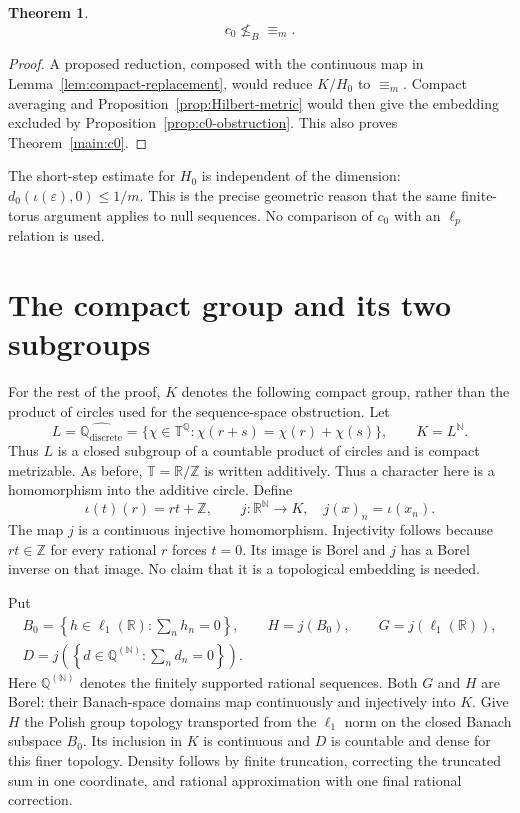 \documentclass[11pt]{article}
\newtheorem{theorem}{Theorem}[section]
\theoremstyle{definition}
\newcommand{\N}{\mathbb N}
\newcommand{\R}{\mathbb R}
\newcommand{\Z}{\mathbb Z}
\newcommand{\T}{\mathbb T}
\newcommand{\ME}{\mathrel{\equiv_m}}
\newcommand{\nleB}{\mathrel{\nleq_B}}
\newcommand{\Q}{\mathbb Q}
\begin{document}
\begin{theorem}\label{thm:c0}
\[
 c_0\nleB\ME.
\]
\end{theorem}
\begin{proof}
A proposed reduction, composed with the continuous map in
Lemma~\ref{lem:compact-replacement}, would reduce $K/H_0$ to $\ME$.
Compact averaging and Proposition~\ref{prop:Hilbert-metric} would then
give the embedding excluded by Proposition~\ref{prop:c0-obstruction}.
This also proves Theorem~\ref{main:c0}.
\end{proof}

The short-step estimate for $H_0$ is independent of the dimension:
$d_0(\iota(\varepsilon),0)\le1/m$. This is the precise geometric reason
that the same finite-torus argument applies to null sequences. No
comparison of $c_0$ with an $\ell_p$ relation is used.

\section{The compact group and its two subgroups}\label{sec:groups}
For the rest of the proof, $K$ denotes the following compact group,
rather than the product of circles used for the sequence-space obstruction.
Let
\[
 L=\widehat{\Q_{\mathrm{discrete}}}
   =\{\chi\in\T^\Q:\chi(r+s)=\chi(r)+\chi(s)\},
 \qquad K=L^\N.
\]
Thus $L$ is a closed subgroup of a countable product of circles and is
compact metrizable. As before, $\T=\R/\Z$ is written additively. Thus a character here
is a homomorphism into the additive circle. Define
\[
 \iota(t)(r)=rt+\Z,\qquad
 j:\R^\N\longrightarrow K,\quad j(x)_n=\iota(x_n).
\]
The map $j$ is a continuous injective homomorphism. Injectivity follows
because $rt\in\Z$ for every rational $r$ forces $t=0$. Its image is
Borel and $j$ has a Borel inverse on that image. No claim that it is
a topological embedding is needed.

Put
\begin{gather*}
 B_0=\left\{h\in\ell_1(\R):\sum_n h_n=0\right\},
 \qquad H=j(B_0),\qquad G=j(\ell_1(\R)),\\
 D=j\left(\left\{d\in\Q^{(\N)}:\sum_n d_n=0\right\}\right).
\end{gather*}
Here $\Q^{(\N)}$ denotes the finitely supported rational sequences.
Both $G$ and $H$ are Borel: their Banach-space domains map continuously
and injectively into $K$. Give $H$ the Polish group topology transported
from the $\ell_1$ norm on the closed Banach subspace $B_0$.
Its inclusion in $K$ is continuous and $D$ is countable and dense for
this finer topology. Density follows by finite truncation, correcting
the truncated sum in one coordinate, and rational approximation with
one final rational correction.
\end{document}
